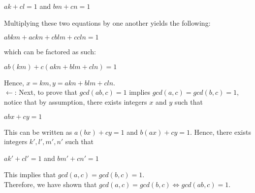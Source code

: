 \documentclass{article}
\begin{document}
\begin{center}
$ak + cl = 1$ and 
$bm + cn = 1$ 
\end{center}

\noindent
Multiplying these two equations by one another yields the following:
\begin{center}
$abkm + ackn + cblm + ccln = 1$
\end{center}
which can be factored as such:
\begin{center}
$ab(km) + c(akn + blm + cln) = 1$
\end{center}

\noindent
Hence, $x = km, y = akn + blm + cln.$ \\

\noindent
$\leftarrow$: Next, to prove that $gcd(ab, c) = 1$ implies $gcd(a, c) = gcd(b, c) = 1$, notice that by assumption, there exists integers $x$ and $y$ such that
\begin{center}
$abx + cy = 1$
\end{center}

\noindent
This can be written as $a(bx) + cy = 1$ and $b(ax) + cy = 1$.  Hence, there exists integers $k', l', m', n'$ such that

\begin{center}
$ak' + cl' = 1$ and $bm' + cn' = 1$
\end{center}

\noindent
This implies that $gcd(a, c) = gcd(b, c) = 1$. \\

\noindent
Therefore, we have shown that $gcd(a, c) = gcd(b, c) \iff gcd(ab, c) = 1.$
\end{document}
